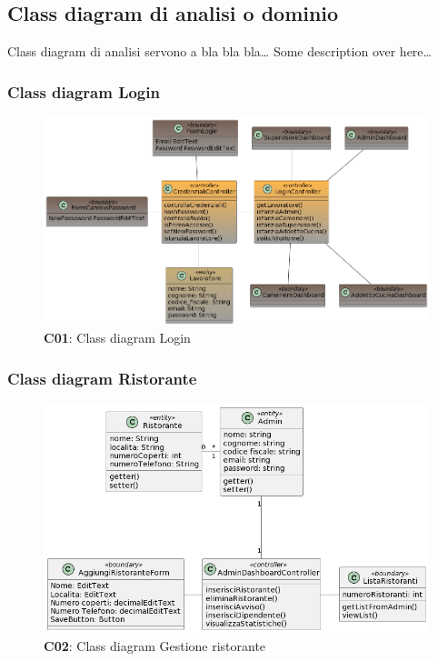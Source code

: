 \subsection{Class diagram di analisi o dominio}

    \begin{flushleft}
        Class diagram di analisi servono a bla bla bla\ldots
        Some description over here\ldots
    \end{flushleft}

    \subsubsection{Class diagram Login}
        \begin{figure}[H]
            \centering
            \includegraphics[scale=0.5]{assets/diagrammi/Class diagram di analisi/Login_3.png}
            \caption{\textbf{C01}: Class diagram Login}\label{fig:Login}
        \end{figure}

    \subsubsection{Class diagram Ristorante}
        \begin{figure}[H]
            \centering
            \includegraphics[scale=0.5]{assets/diagrammi/Class diagram di analisi/Gestione ristorante.png}
            \caption{\textbf{C02}: Class diagram Gestione ristorante}\label{fig:Ristorante}
        \end{figure}

